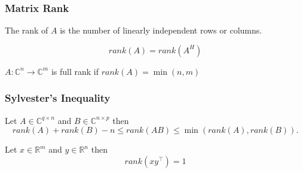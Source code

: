 \documentclass{beamer}
\begin{document}
\begin{frame}\frametitle{Matrix Rank}
	\begin{definition}
		The rank of $A$ is the number of linearly independent rows or columns.
	\end{definition}
	
	\begin{lemma}
		\[ rank(A) = rank(A^H) \]
	\end{lemma}

	\begin{definition}
		$A: \mathbb{C}^n\to \mathbb{C}^m $ is full rank if $rank(A) = \min(n,m)$
	\end{definition}
	
\end{frame}

\begin{frame}\frametitle{Sylvester's Inequality}
	\begin{lemma}
		Let $A \in \mathbb{C}^{q\times n}$ and $B \in \mathbb{C}^{n \times p}$ then 
		\[
			rank(A) + rank(B) - n \leq rank(AB) \leq \min(rank(A),rank(B)).
		\]
	\end{lemma}
	
	\vfill

	\begin{example}
	Let $x \in \mathbb{R}^m$ and $y \in \mathbb{R}^n$ then
	\[ rank(xy^\top) = 1 \]
	
	\end{example}
\end{frame}
\end{document}
